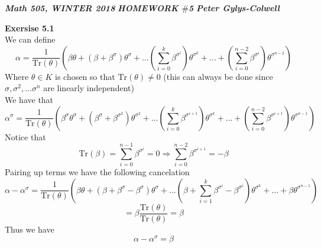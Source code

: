 \documentclass[12pt]{article}
\newenvironment{ques}[1]{\textbf{Exersise #1}\vspace{1 mm}\\ }{\bigskip}
\theoremstyle{definition}
\renewcommand{\l}{\left }
\renewcommand{\r}{\right }
\renewcommand{\t}{\theta}
\renewcommand{\a}{\alpha}
\renewcommand{\b}{\beta}
\newcommand{\Tr}{\text{Tr}}
\newcommand{\s}{\sigma}
\begin{document}
\noindent \textit{\textbf{Math 505, WINTER 2018}} \hspace{1.3cm}
\textit{\textbf{HOMEWORK $\#$5}} \hspace{1.3cm} \textit{\textbf{Peter
Gylys-Colwell}} 

\vspace{1cm}

\begin{ques}{5.1}
	We can define
	$$\a = \frac{1}{\Tr(\t)} \l(\b\t + (\b + \b^{\s})\t^{\s} +
	\dots \l(\sum_{i=0}^k \b^{\s^i} \r)\t^{\s^k} + \dots +\l(\sum_{i=0}^{n-2}
	\b^{\s^i} \r)\t^{\s^{n-2}}\r)$$
	Where $\t \in K$ is chosen so that $\Tr(\t) \neq 0$ (this can always be
	done since $\s, \s^2, \dots \s^n$ are linearly independent)\\
	We have that
	$$\a^\s = \frac{1}{\Tr(\t)} \l(\b^\s\t^\s + (\b^\s + \b^{\s^2})\t^{\s^2} +
	\dots \l(\sum_{i=0}^k \b^{\s^{i+1}} \r)\t^{\s^k} + \dots +\l(\sum_{i=0}^{n-2}
	\b^{\s^{i+1}} \r)\t^{\s^{n-1}}\r)$$
	Notice that 
	$$\Tr(\b) = \sum_{i=0}^{n-1} \b^{\s^{i}} = 0 \Rightarrow \sum_{i=0}^{n-2}
	\b^{\s^{i + 1}} = -\b$$
	Pairing up terms we have the following cancelation
	$$\a - \a^\s = \frac{1}{\Tr(\t)} \l(\b\t + (\b + \b^{\s} - \b^\s)\t^{\s} +
	\dots \l(\b + \sum_{i=1}^k \b^{\s^i} - \b^{\s^i} \r)\t^{\s^k} + \dots
	+\b\t^{\s^{n-1}}\r)$$
	$$= \b\frac{\Tr(\t)}{\Tr(\t)} = \b$$
	Thus we have
	$$\a - \a^\s = \b$$
\end{ques}
\end{document}
